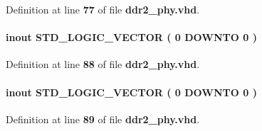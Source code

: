 Definition at line {\bf 77} of file {\bf ddr2\+\_\+phy.\+vhd}.

\paragraph[{mem\+\_\+clk}]{ {\bfseries \textcolor{keywordflow}{inout}\textcolor{vhdlchar}{ }} {\bfseries \textcolor{comment}{S\+T\+D\+\_\+\+L\+O\+G\+I\+C\+\_\+\+V\+E\+C\+T\+OR}\textcolor{vhdlchar}{ }\textcolor{vhdlchar}{(}\textcolor{vhdlchar}{ }\textcolor{vhdlchar}{ } \textcolor{vhdldigit}{0} \textcolor{vhdlchar}{ }\textcolor{keywordflow}{D\+O\+W\+N\+TO}\textcolor{vhdlchar}{ }\textcolor{vhdlchar}{ } \textcolor{vhdldigit}{0} \textcolor{vhdlchar}{ }\textcolor{vhdlchar}{)}\textcolor{vhdlchar}{ }} \hspace{0.3cm}{\ttfamily [Port]}}\label{classddr2__phy_ad18b1719a78b0e3057345b0d58fbdf99}


Definition at line {\bf 88} of file {\bf ddr2\+\_\+phy.\+vhd}.

\paragraph[{mem\+\_\+clk\+\_\+n}]{ {\bfseries \textcolor{keywordflow}{inout}\textcolor{vhdlchar}{ }} {\bfseries \textcolor{comment}{S\+T\+D\+\_\+\+L\+O\+G\+I\+C\+\_\+\+V\+E\+C\+T\+OR}\textcolor{vhdlchar}{ }\textcolor{vhdlchar}{(}\textcolor{vhdlchar}{ }\textcolor{vhdlchar}{ } \textcolor{vhdldigit}{0} \textcolor{vhdlchar}{ }\textcolor{keywordflow}{D\+O\+W\+N\+TO}\textcolor{vhdlchar}{ }\textcolor{vhdlchar}{ } \textcolor{vhdldigit}{0} \textcolor{vhdlchar}{ }\textcolor{vhdlchar}{)}\textcolor{vhdlchar}{ }} \hspace{0.3cm}{\ttfamily [Port]}}\label{classddr2__phy_acb82ca9a03249fe1ec9968c46cb7ac9a}


Definition at line {\bf 89} of file {\bf ddr2\+\_\+phy.\+vhd}.

